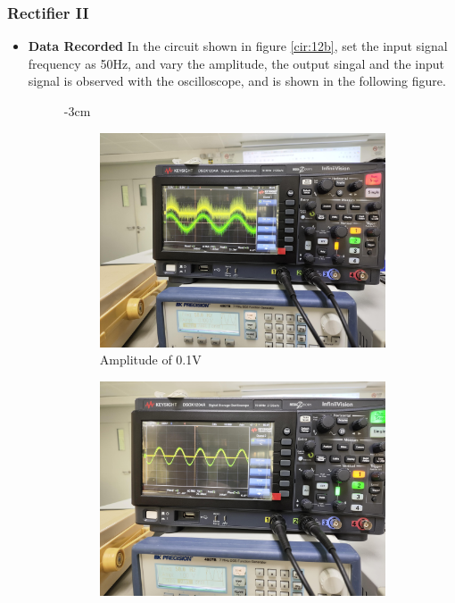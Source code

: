     \subsubsection{Rectifier II}
    \begin{itemize}
        \item \textbf{Data Recorded}\newline
        In the circuit shown in figure \ref{cir:12b}, set the input signal frequency as 50Hz, and vary the amplitude, the output singal and the input signal is observed with the oscilloscope, and is shown in the following figure.\par
        \begin{figure}[H]
        \addtolength{\leftskip} {-3cm}
        \addtolength{\rightskip}{-3cm}
        \centering
            \begin{subfigure}{0.3\textwidth}
                \centering
                \includegraphics[width=1\linewidth]{Experiment_12/Images/RetB 50-0-min.jpg}
                \caption{Amplitude of 0.1V}
                \label{l120wf2}
            \end{subfigure}
            \begin{subfigure}{0.3\textwidth}
                \centering
                \includegraphics[width=1\linewidth]{Experiment_12/Images/RetB 50-1-min.jpg}

\end{subfigure}
\end{figure}
\end{itemize}
